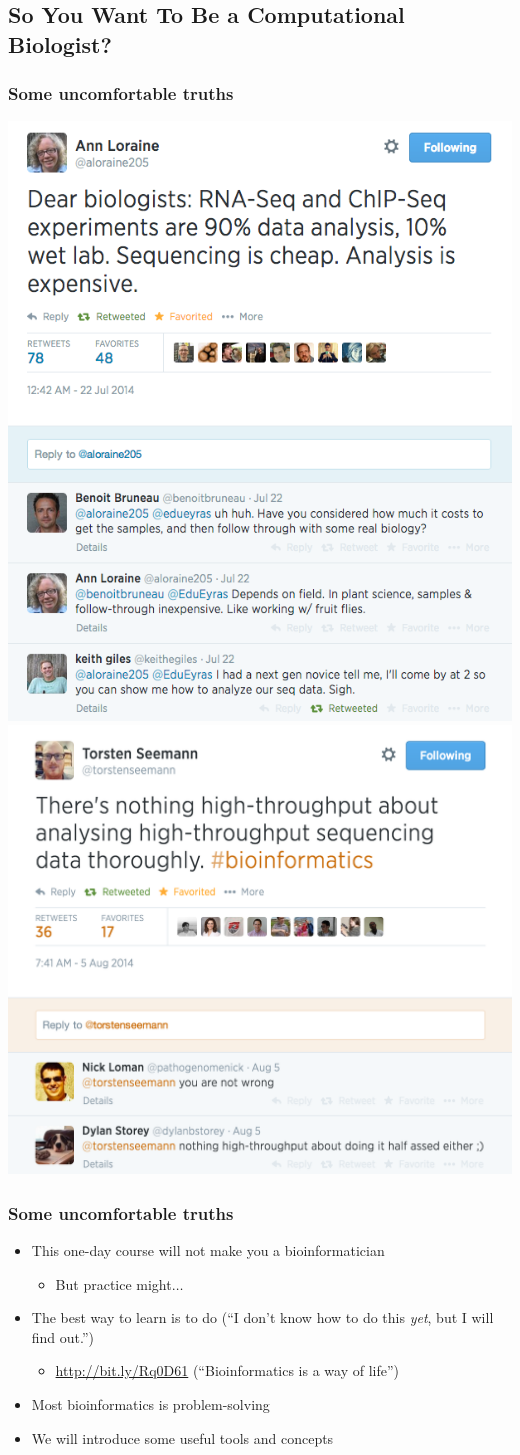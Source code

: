 \subsection{So You Want To Be a Computational Biologist?}
\begin{frame}
  \frametitle{Some uncomfortable truths}
  \includegraphics[width=.5\textwidth]{images/twitter_rnaseq}
  \includegraphics[width=.5\textwidth]{images/twitter_high_throughput}  
\end{frame}

\begin{frame}
  \frametitle{Some uncomfortable truths}
  \begin{itemize}
    \item<1-> This one-day course will not make you a bioinformatician
    \begin{itemize}
      \item<2-> But practice might$\ldots$
    \end{itemize}
    \item<3-> The best way to learn is to do (``I don't know how to do this \emph{yet}, but I will find out.'')
    \begin{itemize}
      \item \url{http://bit.ly/Rq0D61} (``Bioinformatics is a way of life'')
    \end{itemize}
    \item<3-> Most bioinformatics is problem-solving
    \item<3-> We will introduce some useful tools and concepts
  \end{itemize}
\end{frame}

